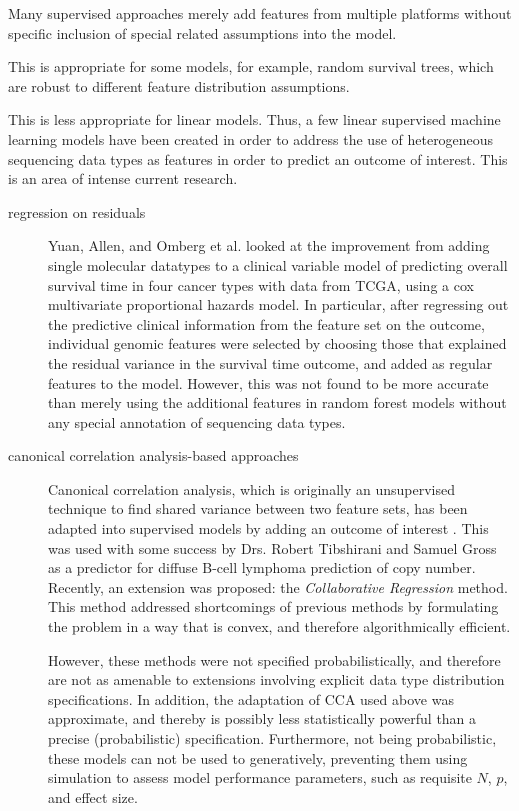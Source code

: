 Many supervised approaches merely add features from multiple platforms without specific inclusion of special related assumptions into the model.

This is appropriate for some models, for example, random survival trees, which are robust to different feature distribution assumptions.

This is less appropriate for linear models. Thus, a few linear supervised machine learning models have been created in order to address the use of heterogeneous sequencing data types as features in order to predict an outcome of interest. This is an area of intense current research.

\begin{description}
\item[regression on residuals]
  Yuan, Allen, and Omberg et al. \cite{yuan_assessing_2014} looked at the improvement from adding single molecular datatypes to a clinical variable model of predicting overall survival time in four cancer types with data from TCGA, using a cox multivariate proportional hazards model. In particular, after regressing out the predictive clinical information from the feature set on the outcome, individual genomic features were selected by choosing those that explained the residual variance in the survival time outcome, and added as regular features to the model. However, this was not found to be more accurate than merely using the additional features in random forest models without any special annotation of sequencing data types.  


\item[canonical correlation analysis-based approaches]
  Canonical correlation analysis, which is originally an unsupervised technique to find shared variance between two feature sets, has been adapted into supervised models by adding an outcome of interest \cite{shen_novel_2014} \cite{bair_prediction_2006}\cite{yu_supervised_2006}\cite{witten_extensions_2009}. This was used with some success by Drs. Robert Tibshirani and Samuel Gross as a predictor for diffuse B-cell lymphoma prediction of copy number. Recently, an extension was proposed: the \textit{Collaborative Regression} method\cite{gross_collaborative_2015}. This method addressed shortcomings of previous methods by formulating the problem in a way that is convex, and therefore algorithmically efficient.

  However, these methods were not specified probabilistically, and therefore are not as amenable to extensions involving explicit data type distribution specifications. In addition, the adaptation of CCA used above was approximate, and thereby is possibly less statistically powerful than a precise (probabilistic) specification. Furthermore, not being probabilistic, these models can not be used to generatively, preventing them using simulation to assess model performance parameters, such as requisite $N$, $p$, and effect size. 
  
\end{description}



